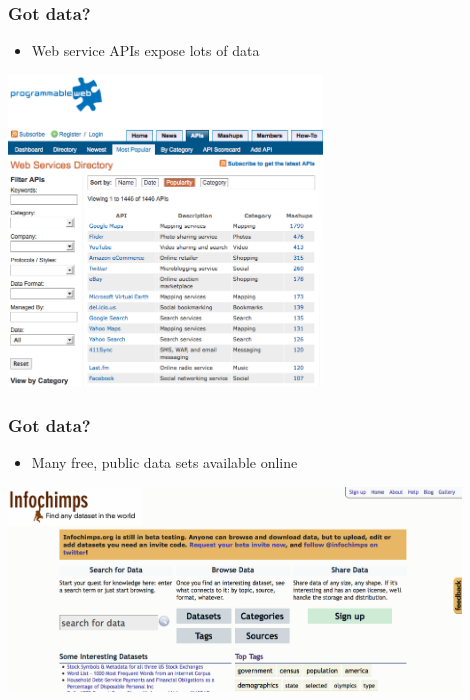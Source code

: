 \documentclass[xcolor=dvipsnames, 9pt]{beamer}
\begin{document}

\begin{frame}
  \frametitle{Got data?}

  \begin{itemize}
    \item Web service APIs expose lots of data
  \end{itemize}

    \begin{center}
      \includegraphics[width=0.625\textwidth]{programmableweb.png}
    \end{center}

\end{frame}

\begin{frame}
  \frametitle{Got data?}

  \begin{itemize}
    \item Many free, public data sets available online
  \end{itemize}

    \begin{center}
      \includegraphics[width=0.9\textwidth]{infochimps.png}
    \end{center}

\end{frame}
\end{document}
